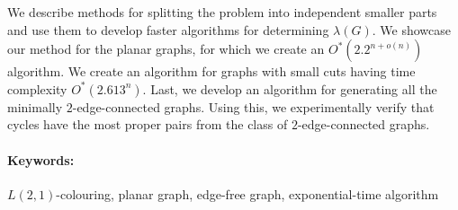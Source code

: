 \documentclass[12pt, oneside]{book}
\begin{document}
We describe methods for splitting the problem into independent smaller parts
and use them to develop faster algorithms for determining $\lambda(G)$.
We showcase our method for the planar graphs, for which we create an $O^*(2.2^{n + o(n)})$
algorithm. We create an algorithm for graphs with small cuts having time complexity
$O^*(2.613^n)$. Last, we develop an algorithm for generating all the minimally $2$-edge-connected
graphs. Using this, we experimentally verify that cycles have the most proper pairs from
the class of $2$-edge-connected graphs.

\paragraph*{Keywords:} $L(2,1)$-colouring, planar graph, edge-free graph, exponential-time algorithm 


%
%



\newpage 

\tableofcontents



\newpage 

\listoffigures


\mainmatter


 











\end{document}
